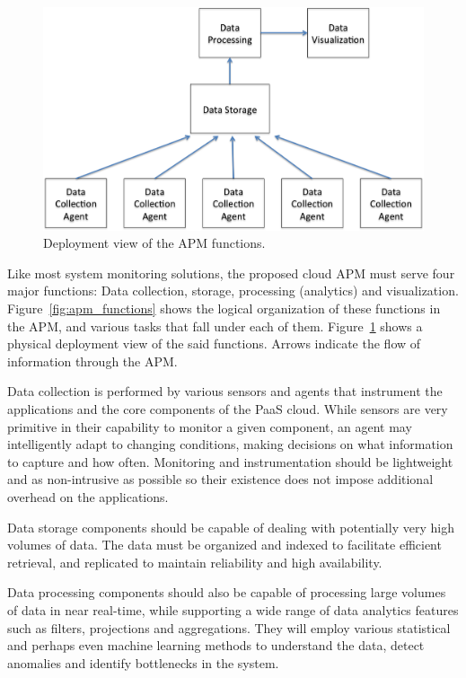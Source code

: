 \documentclass[11pt]{article}
\begin{document}
\begin{figure}
\centering
\includegraphics[scale=0.5]{apm_layout}
\caption{Deployment view of the APM functions.}
\label{fig:apm_layout}
\end{figure}

Like most system monitoring solutions, the proposed cloud APM must serve four major functions: Data
collection, storage, processing (analytics) and visualization. Figure~\ref{fig:apm_functions} shows the
logical organization of these functions in the APM, and various tasks that fall under each of them.
Figure~\ref{fig:apm_layout} shows a physical deployment view of the said functions. Arrows indicate
the flow of information through the APM.

Data collection is performed by various sensors and agents that instrument the applications and the
core components of the PaaS cloud. While sensors are very primitive in their capability to monitor
a given component, an agent may intelligently adapt to changing conditions, making decisions on
what information to capture and how often. Monitoring and instrumentation should be lightweight and as non-intrusive
as possible so their existence does not impose additional overhead 
on the applications.

Data storage components should be capable of
dealing with potentially very high volumes of data. The data must be organized and indexed
to facilitate efficient retrieval, and replicated to maintain reliability and high availability. 

Data processing components should also be capable of processing large volumes of data in near real-time,
while supporting a wide range of data analytics features such as filters, projections and aggregations. 
They will employ various statistical and perhaps even machine learning methods to understand the
data, detect anomalies and identify bottlenecks in the system.
\end{document}
